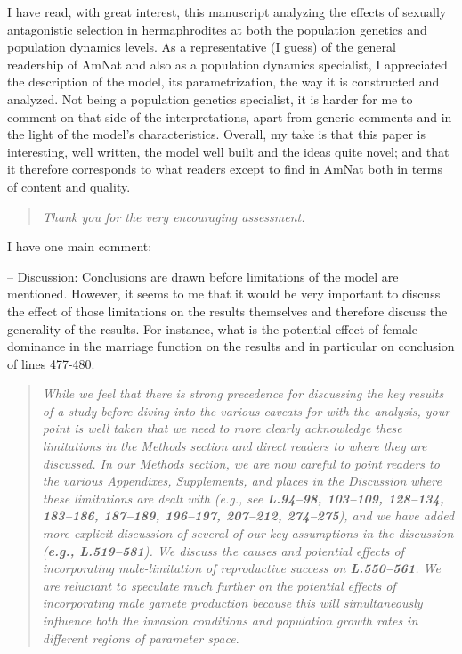 \documentclass[11pt]{article}
\begin{document}
I have read, with great interest, this manuscript analyzing the effects of sexually antagonistic selection in hermaphrodites at both the population genetics and population dynamics levels. As a representative (I guess) of the general readership of AmNat and also as a population dynamics specialist, I appreciated the description of the model, its parametrization, the way it is constructed and analyzed. Not being a population genetics specialist, it is harder for me to comment on that side of the interpretations, apart from generic comments and in the light of the model’s characteristics. Overall, my take is that this paper is interesting, well written, the model well built and the ideas quite novel; and that it therefore corresponds to what readers except to find in AmNat both in terms of content and quality.

\begin{quote}
	{\itshape Thank you for the very encouraging assessment.}
\end{quote}

\noindent I have one main comment:

\noindent-- Discussion: Conclusions are drawn before limitations of the model are mentioned. However, it seems to me that it would be very important to discuss the effect of those limitations on the results themselves and therefore discuss the generality of the results. For instance, what is the potential effect of female dominance in the marriage function on the results and in particular on conclusion of lines 477-480.

\begin{quote}
	{\itshape While we feel that there is strong precedence for discussing the key results of a study before diving into the various caveats for with the analysis, your point is well taken that we need to more clearly acknowledge these limitations in the Methods section and direct readers to where they are discussed. In our Methods section, we are now careful to point readers to the various Appendixes, Supplements, and places in the Discussion where these limitations are dealt with (e.g., see {\bf L.94--98, 103--109, 128--134, 183--186, 187--189, 196--197, 207--212, 274--275}), and we have added more explicit discussion of several of our key assumptions in the discussion ({\bf e.g., L.519--581}). We discuss the causes and potential effects of incorporating male-limitation of reproductive success on {\bf L.550--561}. We are reluctant to speculate much further on the potential effects of incorporating male gamete production because this will simultaneously influence both the invasion conditions and population growth rates in different regions of parameter space}.
\end{quote}
\end{document}
